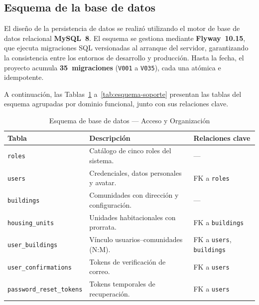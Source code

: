 \subsection{Esquema de la base de datos}
El diseño de la persistencia de datos se realizó utilizando el motor de base de datos relacional \textbf{MySQL~8}. El esquema se gestiona mediante \textbf{Flyway~10.15}, que ejecuta migraciones SQL versionadas al arranque del servidor, garantizando la consistencia entre los entornos de desarrollo y producción. Hasta la fecha, el proyecto acumula \textbf{35~migraciones} (\texttt{V001} a \texttt{V035}), cada una atómica e idempotente.

A continuación, las Tablas~\ref{tab:esquema-acceso} a~\ref{tab:esquema-soporte} presentan las tablas del esquema agrupadas por dominio funcional, junto con sus relaciones clave.

\begin{table}[H]
\centering
\caption{Esquema de base de datos --- Acceso y Organización}\label{tab:esquema-acceso}
\begin{tabular}{|p{}|p{}|p{}|}
\hline
\textbf{Tabla} & \textbf{Descripción} & \textbf{Relaciones clave} \\
\hline
\texttt{roles} & Catálogo de cinco roles del sistema. & --- \\
\hline
\texttt{users} & Credenciales, datos personales y avatar. & FK a \texttt{roles} \\
\hline
\texttt{buildings} & Comunidades con dirección y configuración. & --- \\
\hline
\texttt{housing\_units} & Unidades habitacionales con prorrata. & FK a \texttt{buildings} \\
\hline
\texttt{user\_buildings} & Vínculo usuarios--comunidades (N:M). & FK a \texttt{users}, \texttt{buildings} \\
\hline
\texttt{user\_confirmations} & Tokens de verificación de correo. & FK a \texttt{users} \\
\hline
\texttt{password\_reset\_tokens} & Tokens temporales de recuperación. & FK a \texttt{users} \\
\hline
\end{tabular}
\end{table}

